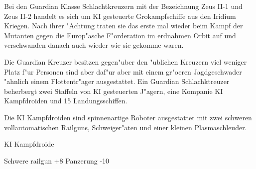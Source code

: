 
Bei den Guardian Klasse Schlachtkreuzern mit der Bezeichnung Zeus II-1 und Zeus II-2 handelt es sich um KI gesteuerte Gro\3kampfschiffe aus den Iridium Kriegen. Nach ihrer "Achtung traten sie das erste mal wieder beim Kampf der Mutanten gegen die Europ"asche F"orderation im erdnahmen Orbit auf und verschwanden danach auch wieder wie sie gekomme waren.

Die Guardian Kreuzer besitzen gegen"uber den "ublichen Kreuzern viel weniger Platz f"ur Personen sind aber daf"ur aber mit einem gr"o\3eren Jagdgeschwader "ahnlich einem Flottentr"ager ausgestattet. Ein Guardian Schlachktreuzer beherbergt zwei Staffeln von KI gesteuerten J"agern, eine Kompanie KI Kampfdroiden und 15 Landungsschiffen.

Die KI Kampfdroiden sind spinnenartige Roboter ausgestattet mit zwei schweren vollautomatischen Railguns, Schwei\3ger"aten und einer kleinen Plasmaschleuder.

\begin{nscsheet}[f]{KI Kampfdroide}
    \nscstats[ATT=8,AGG=6,EMP=-,KNO=-,HP=15]
    \nscruler
    \begin{nscinventory}
        \nscitem[Waffen] Schwere railgun +8
        \nscitem[R"ustung] Panzerung -10
    \end{nscinventory}
\end{nscsheet}

